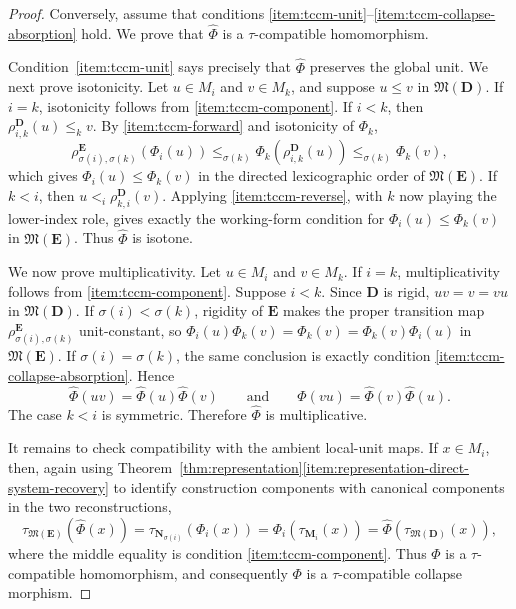 \documentclass[pdflatex,sn-mathphys-num]{sn-jnl}
\theoremstyle{thmstyleone}%
\theoremstyle{thmstyletwo}%
\theoremstyle{thmstylethree}%
\begin{document}
\begin{proof}
Conversely, assume that conditions \ref{item:tccm-unit}--\ref{item:tccm-collapse-absorption} hold.
We prove that \(\widehat\Phi\) is a \(\tau\)-compatible homomorphism.

Condition~\ref{item:tccm-unit} says precisely that \(\widehat\Phi\) preserves the global unit.
We next prove isotonicity.
Let \(u\in M_i\) and \(v\in M_k\), and suppose \(u\le v\) in \(\mathfrak M(\mathbf D)\).
If \(i=k\), isotonicity follows from \ref{item:tccm-component}.
If \(i<k\), then \(\rho^{\mathbf D}_{i,k}(u)\le_k v\).
By \ref{item:tccm-forward} and isotonicity of \(\Phi_k\),
\[
\rho^{\mathbf E}_{\sigma(i),\sigma(k)}(\Phi_i(u))
\le_{\sigma(k)}
\Phi_k(\rho^{\mathbf D}_{i,k}(u))
\le_{\sigma(k)}
\Phi_k(v),
\]
which gives \(\Phi_i(u)\le \Phi_k(v)\) in the directed lexicographic order of \(\mathfrak M(\mathbf E)\).
If \(k<i\), then \(u<_i\rho^{\mathbf D}_{k,i}(v)\).
Applying \ref{item:tccm-reverse}, with \(k\) now playing the lower-index role, gives exactly the working-form condition for \(\Phi_i(u)\le \Phi_k(v)\) in \(\mathfrak M(\mathbf E)\).
Thus \(\widehat\Phi\) is isotone.

We now prove multiplicativity.
Let \(u\in M_i\) and \(v\in M_k\).
If \(i=k\), multiplicativity follows from \ref{item:tccm-component}.
Suppose \(i<k\).
Since \(\mathbf D\) is rigid, \(uv=v=vu\) in \(\mathfrak M(\mathbf D)\).
If \(\sigma(i)<\sigma(k)\), rigidity of \(\mathbf E\) makes the proper transition map \(\rho^{\mathbf E}_{\sigma(i),\sigma(k)}\) unit-constant, so \(\Phi_i(u)\Phi_k(v)=\Phi_k(v)=\Phi_k(v)\Phi_i(u) \) in \(\mathfrak M(\mathbf E)\).
If \(\sigma(i)=\sigma(k)\), the same conclusion is exactly condition \ref{item:tccm-collapse-absorption}.
Hence
\[
\widehat\Phi(uv)=\widehat\Phi(u)\widehat\Phi(v)
\qquad\text{and}\qquad
\widehat\Phi(vu)=\widehat\Phi(v)\widehat\Phi(u).
\]
The case \(k<i\) is symmetric.
Therefore \(\widehat\Phi\) is multiplicative.

It remains to check compatibility with the ambient local-unit maps.
If \(x\in M_i\), then, again using Theorem~\ref{thm:representation}\ref{item:representation-direct-system-recovery} to identify construction components with canonical components in the two reconstructions,
\[
\tau_{\mathfrak M(\mathbf E)}(\widehat\Phi(x))
=
\tau_{\mathbf N_{\sigma(i)}}(\Phi_i(x))
=
\Phi_i(\tau_{\mathbf M_i}(x))
=
\widehat\Phi(\tau_{\mathfrak M(\mathbf D)}(x)),
\]
where the middle equality is condition \ref{item:tccm-component}.
Thus \(\widehat\Phi\) is a \(\tau\)-compatible homomorphism, and consequently \(\Phi\) is a \(\tau\)-compatible collapse morphism.
\end{proof}
\end{document}
